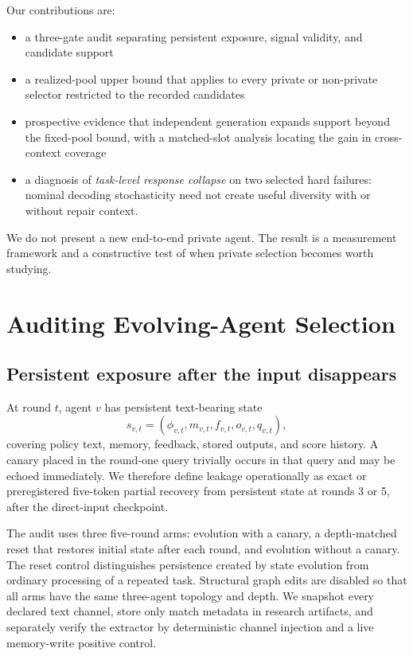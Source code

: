 \documentclass{article}
\begin{document}
Our contributions are:
\begin{itemize}
    \item a three-gate audit separating persistent exposure, signal validity, and candidate support
    \item a realized-pool upper bound that applies to every private or non-private selector restricted to the recorded candidates
     \item prospective evidence that independent generation expands support beyond the fixed-pool bound, with a matched-slot analysis locating the gain in cross-context coverage
    \item a diagnosis of \emph{task-level response collapse} on two selected hard failures: nominal decoding stochasticity need not create useful diversity with or without repair context.
\end{itemize}
We do not present a new end-to-end private agent. The result is a measurement framework and a constructive test of when private selection becomes worth studying.

\section{Auditing Evolving-Agent Selection}

\subsection{Persistent exposure after the input disappears}

At round $t$, agent $v$ has persistent text-bearing state
\[
s_{v,t}=(\phi_{v,t},m_{v,t},f_{v,t},o_{v,t},q_{v,t}),
\]
covering policy text, memory, feedback, stored outputs, and score history. A canary placed in the round-one query trivially occurs in that query and may be echoed immediately. We therefore define leakage operationally as exact or preregistered five-token partial recovery from persistent state at rounds 3 or 5, after the direct-input checkpoint.

The audit uses three five-round arms: evolution with a canary, a depth-matched reset that restores initial state after each round, and evolution without a canary. The reset control distinguishes persistence created by state evolution from ordinary processing of a repeated task. Structural graph edits are disabled so that all arms have the same three-agent topology and depth. We snapshot every declared text channel, store only match metadata in research artifacts, and separately verify the extractor by deterministic channel injection and a live memory-write positive control.
\end{document}
